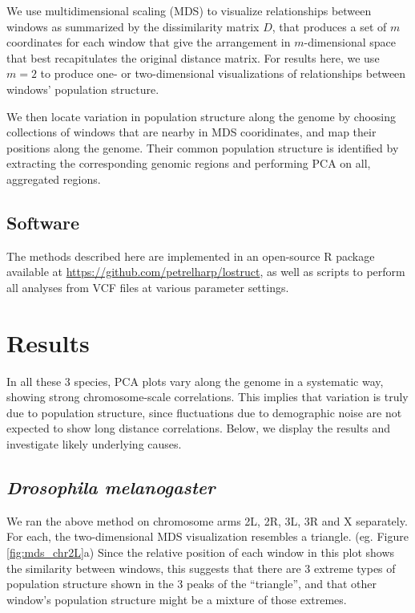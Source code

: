 \documentclass[11pt, oneside]{article}   	%
\begin{document}
We use multidimensional scaling (MDS) to visualize relationships between windows
as summarized by the dissimilarity matrix $D$,
that produces a set of $m$ coordinates for each window that
give the arrangement in $m$-dimensional space that best recapitulates the original distance matrix.
For results here, we use $m=2$ to produce one- or two-dimensional visualizations of relationships between windows' population structure.

We then locate variation in population structure along the genome
by choosing collections of windows that are nearby in MDS cooridinates,
and map their positions along the genome.
Their common population structure is identified by extracting the corresponding genomic regions
and performing PCA on all, aggregated regions.


\subsection{Software}

The methods described here
are implemented in an open-source R package
available at \url{https://github.com/petrelharp/lostruct},
as well as scripts to perform all analyses from VCF files
at various parameter settings.


\section{Results}

In all these 3 species, PCA plots vary along the genome in a systematic way, showing strong chromosome-scale correlations.
This implies that variation is truly due to population structure, 
since fluctuations due to demographic noise are not expected to show long distance correlations. 
Below, we display the results and investigate likely underlying causes.

\subsection{\textit{Drosophila melanogaster}}
We ran the above method on chromosome arms 2L, 2R, 3L, 3R and X separately. 
For each, the two-dimensional MDS visualization resembles a triangle. (eg. Figure \ref{fig:mds_chr2L}a) 
Since the relative position of each window in this plot shows the similarity between windows, this suggests that there are 3 extreme types of population structure shown in the 3 peaks of the ``triangle'', and that other window's population structure might be a mixture of those extremes. 
\end{document}
